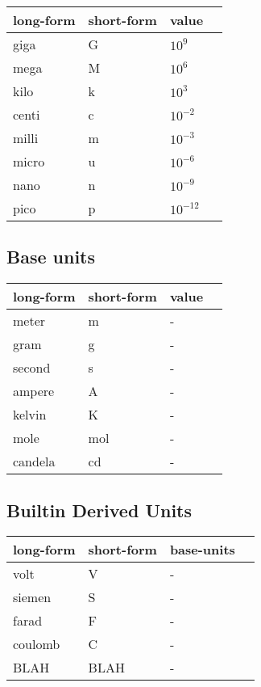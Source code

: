 \documentclass{article}
\begin{document}
\begin{center}
    \begin{tabular}{ | l | l |  l | p{5cm} |}
    \hline
    long-form & short-form & value  \\ \hline
    giga & G & $10^9$ \\ \hline
    mega & M & $10^6$ \\ \hline
    kilo & k & $10^3$ \\ \hline
    centi & c & $10^{-2}$ \\ \hline
    milli & m & $10^{-3}$ \\ \hline
    micro & u & $10^{-6}$ \\ \hline
    nano & n & $10^{-9}$ \\ \hline
    pico & p & $10^{-12}$ \\ \hline
    \end{tabular}
\end{center}


\subsection*{Base units}

\begin{center}
    \begin{tabular}{ | l | l |  l | p{5cm} |}
    \hline
    long-form & short-form & value  \\ \hline
    meter & m & - \\ \hline
    gram & g & - \\ \hline
    second & s & - \\ \hline
    ampere & A & - \\ \hline
    kelvin & K & - \\ \hline
    mole & mol & - \\ \hline
    candela & cd & - \\ \hline
    \end{tabular}
\end{center}

\subsection{Builtin Derived Units}

\begin{center}
    \begin{tabular}{ | l | l |  l | p{5cm} |}
    \hline
    long-form & short-form & base-units  \\ \hline
    volt & V & - \\ \hline
    siemen & S & - \\ \hline
    farad & F & - \\ \hline
    coulomb & C & - \\ \hline
    BLAH & BLAH & - \\ \hline
    \end{tabular}
\end{center}
\end{document}
